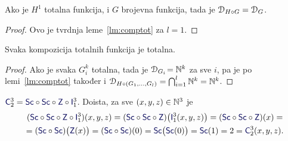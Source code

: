 \begin{korolar}[{name=[kompozicija s totalnom funkcijom slijeva ne mijenja domenu]}]\label{kor:comptot}
    Ako je $H^1$ totalna funkcija, i $G$ brojevna funkcija, tada je $\mathcal D_{H\circ G}=\mathcal D_{G}$.
\end{korolar}
\begin{proof}
    Ovo je tvrdnja leme~\ref{lm:comptot} za $l=1$.
\end{proof}

\begin{propozicija}[{name=[totalnost kompozicije totalnih funkcija]}]\label{prop:comptot}
Svaka kompozicija totalnih funkcija je totalna.
\end{propozicija}
\begin{proof}
    Ako je svaka $G_i^k$ totalna, tada je $\mathcal D_{G_i}\!={\mathbb N}^k$ za sve $i$, pa je po lemi~\ref{lm:comptot} također i $\mathcal D_{H\circ(G_1,\dotsc,G_l)}=\bigcap_{i=1}^l{\mathbb N}^k={\mathbb N}^k$.
\end{proof}

\begin{primjer}[{name=[prikaz konstante kao kompozicije inicijalnih funkcija]}]\label{pr:C23}
	$\f C_2^3=\f{Sc}\circ\f{Sc}\circ\f Z\circ\f I_1^3$. Doista, za sve $(x,y,z)\in{\mathbb N}^3$ je
\begin{multline}
(\f{Sc}\circ\f{Sc}\circ\f Z\circ\f I_1^3)(x,y,z)=(\f{Sc}\circ\f{Sc}\circ\f Z)\bigl(\f I_1^3(x,y,z)\bigr)=(\f{Sc}\circ\f{Sc}\circ\f Z)(x)=\\
=(\f{Sc}\circ\f{Sc})\bigl(\f Z(x)\bigr)=(\f{Sc}\circ\f{Sc})(0)=\f{Sc}\bigl(\f{Sc}(0)\bigr)=\f{Sc}(1)=2=\f C_2^3(x,y,z).\text\qedhere
\end{multline}
\end{primjer}


